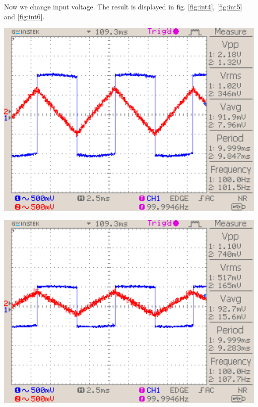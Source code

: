 \documentclass[a4paper,10pt]{article}
\newenvironment{Figure}
        {\par\medskip\noindent\minipage{\linewidth}}
        {\endminipage\par\medskip}
\numberwithin{equation}{section}
\begin{document}
\begin{multicols}{2}
	Now we change input voltage. The result is displayed in fig. \ref{fig:int4}, \ref{fig:int5} and \ref{fig:int6}.
	\begin{Figure}
		\centering
		\includegraphics[width=1\textwidth]{../data/DS0035_n.png}
		\label{fig:int4}
	\end{Figure}
	\begin{Figure}
		\centering
		\includegraphics[width=1\textwidth]{../data/DS0036_n.png}
		\label{fig:int5}
	\end{Figure}
	\begin{Figure}
		\centering

\end{Figure}
\end{multicols}
\end{document}
